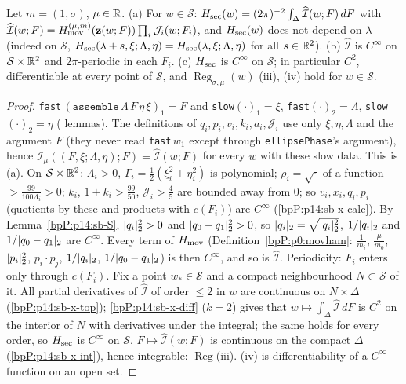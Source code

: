 \begin{proposition}\label{bpP:p14:sb-smooth-prop}
Let $m=(1,\sigma)$, $\mu\in\mathbb{R}$. (a) For $w\in\mathcal S$: $H_{\rm sec}(w)=(2\pi)^{-2}\int_\Delta\widehat{\mathcal I}(w;F)\,dF$ with $\widehat{\mathcal I}(w;F)=H_{\rm mov}^{(\mu,m)}(\mathbf z(w;F))\prod_i\mathcal J_i(w;F_i)$, and $H_{\rm sec}(w)$ does not depend on $\lambda$ (indeed on $\mathcal S$, $H_{\rm sec}(\lambda+s,\xi;\Lambda,\eta)=H_{\rm sec}(\lambda,\xi;\Lambda,\eta)$ for all $s\in\mathbb{R}^2$).
(b) $\widehat{\mathcal I}$ is $C^\infty$ on $\mathcal S\times\mathbb{R}^2$ and $2\pi$-periodic in each $F_i$. (c) $H_{\rm sec}$ is $C^\infty$ on $\mathcal S$; in particular $C^2$, differentiable at every point of $\mathcal S$, and $\operatorname{Reg}_{\sigma,\mu}(w)$ (iii), (iv) hold for $w\in\mathcal S$.
\end{proposition}
\begin{proof}
\label{stepP:p14:sb-sm-1} \texttt{fast}\,$(\texttt{assemble}\,\Lambda\,F\,\eta\,\xi)_1=F$ and \texttt{slow}$(\cdot)_1=\xi$, \texttt{fast}$(\cdot)_2=\Lambda$, \texttt{slow}$(\cdot)_2=\eta$ ( lemmas). The definitions of $q_i,p_i,v_i,k_i,a_i,\mathcal J_i$ use only $\xi,\eta,\Lambda$ and the argument $F$ (they never read \texttt{fast}\,$w_1$ except through \texttt{ellipsePhase}'s argument), hence $\mathcal I_\mu((F,\xi;\Lambda,\eta);F)=\widehat{\mathcal I}(w;F)$ for every $w$ with these slow data. This is (a).
\label{stepP:p14:sb-sm-2} On $\mathcal S\times\mathbb{R}^2$: $\Lambda_i>0$, $\Gamma_i=\frac12(\xi_i^2+\eta_i^2)$ is polynomial; $\rho_i=\sqrt{\cdot}$ of a function $>\frac{99}{100\Lambda_i}>0$; $k_i$, $1+k_i>\frac{99}{50}$, $\mathcal J_i>\frac45$ are bounded away from $0$; so $v_i,x_i,q_i,p_i$ (quotients by these and products with $c(F_i)$) are $C^\infty$ (\ref{bpP:p14:sb-x-calc}). By Lemma~\ref{bpP:p14:sb-S}, $\lvert q_i\rvert_2^2>0$ and $\lvert q_0-q_1\rvert_2^2>0$, so $\lvert q_i\rvert_2=\sqrt{\lvert q_i\rvert_2^2}$, $1/\lvert q_i\rvert_2$ and $1/\lvert q_0-q_1\rvert_2$ are $C^\infty$. Every term of $H_{\rm mov}$ (Definition~\ref{bpP:p0:movham}: $\frac1{m_i}$, $\frac\mu{m_0}$, $\lvert p_i\rvert_2^2$, $p_i\cdot p_j$, $1/\lvert q_i\rvert_2$, $1/\lvert q_0-q_1\rvert_2$) is then $C^\infty$, and so is $\widehat{\mathcal I}$. Periodicity: $F_i$ enters only through $c(F_i)$.
\label{stepP:p14:sb-sm-3} Fix a point $w_*\in\mathcal S$ and a compact neighbourhood $N\subset\mathcal S$ of it. All partial derivatives of $\widehat{\mathcal I}$ of order $\le2$ in $w$ are continuous on $N\times\Delta$ (\ref{bpP:p14:sb-x-top}); \ref{bpP:p14:sb-x-diff} ($k=2$) gives that $w\mapsto\int_\Delta\widehat{\mathcal I}\,dF$ is $C^2$ on the interior of $N$ with derivatives under the integral; the same holds for every order, so $H_{\rm sec}$ is $C^\infty$ on $\mathcal S$.
\label{stepP:p14:sb-sm-4} $F\mapsto\widehat{\mathcal I}(w;F)$ is continuous on the compact $\Delta$ (\ref{bpP:p14:sb-x-int}), hence integrable: $\operatorname{Reg}$(iii). (iv) is differentiability of a $C^\infty$ function on an open set.
\end{proof}


